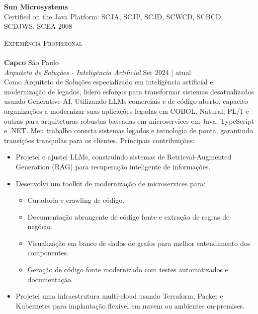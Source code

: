 \documentclass[a4paper]{article}
\newcommand{\lineunder} {
    \vspace*{-8pt} \\
    \hspace*{-18pt} \hrulefill \\
}
\newcommand{\header} [1] {
    {\hspace*{-18pt}\vspace*{6pt} \textsc{#1}}
    \vspace*{-6pt} \lineunder
}
\begin{document}
\vspace{1.0mm}
\textbf{Sun Microsystems}\hfill \\
Certified on the Java Platform: SCJA, 
SCJP, SCJD, SCWCD, SCBCD, SCDJWS, SCEA \hfill 2008\\
\vspace{2mm}

\header{Experiência Profissional}
\vspace{1mm}
\textbf{Capco}                                                      \hfill São Paulo              \\
\textit{Arquiteto de Soluções - Inteligência Artificial}             
 \hfill Set 2024 | atual    \\
\vspace{1mm}
Como Arquiteto de Soluções especializado em inteligência artificial e modernização de legados, lidero esforços para transformar sistemas desatualizados usando Generative AI. 
Utilizando LLMs comerciais e de código aberto, capacito organizações a modernizar suas aplicações legadas em COBOL, Natural, PL/1 e outras para arquiteturas robustas baseadas em microservices em Java, TypeScript e .NET. 
Meu trabalho conecta sistemas legados e tecnologia de ponta, garantindo transições tranquilas para os clientes. 
\newline
Principais contribuições:
\vspace{-2mm}
\begin{itemize}
\setlength\itemsep{-1mm}
\item Projetei e ajustei LLMs, construindo sistemas de Retrieval-Augmented Generation (RAG) para recuperação inteligente de informações. 
\item Desenvolvi um toolkit de modernização de microservices para:
\vspace{-2mm}
\begin{itemize}
\setlength\itemsep{-1mm}
    \item Curadoria e crawling de código. 
\item Documentação abrangente de código fonte e extração de regras de negócio.
    \item Visualização em banco de dados de grafos para melhor entendimento dos componentes. 
\item Geração de código fonte modernizado com testes automatizados e documentação. 
\end{itemize}
\vspace{-2mm}
\item Projetei uma infraestrutura multi-cloud usando Terraform, Packer e Kubernetes para implantação flexível em nuvem ou ambientes on-premises. 
\end{itemize}
\end{document}
